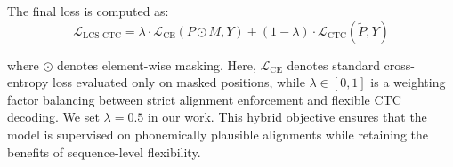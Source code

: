 The final loss is computed as:
\begin{equation*}
\mathcal{L}_{\text{LCS-CTC}} = \lambda \cdot \mathcal{L}_{\text{CE}}(P \odot M, Y) + (1 - \lambda) \cdot \mathcal{L}_{\text{CTC}}(\tilde{P}, Y)
\end{equation*}

where $\odot$ denotes element-wise masking. Here, $\mathcal{L}_{\text{CE}}$ denotes standard cross-entropy loss evaluated only on masked positions, while $\lambda \in [0,1]$ is a weighting factor balancing between strict alignment enforcement and flexible CTC decoding. We set $\lambda = 0.5$ in our work. This hybrid objective ensures that the model is supervised on phonemically plausible alignments while retaining the benefits of sequence-level flexibility.


